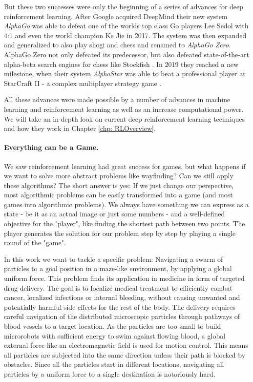  But these two successes were only the beginning of a series of advances for deep reinforcement learning. After Google acquired DeepMind their new system \textit{AlphaGo} was able to defeat one of the worlds top class Go players Lee Sedol with 4:1 \cite{borowiec2016alphago} and even the world champion Ke Jie in 2017. The system was then expanded and generalized to also play shogi and chess and renamed to \textit{AlphaGo Zero}. AlphaGo Zero not only defeated its predecessor, but also defeated state-of-the-art alpha-beta search engines for chess like Stockfish \cite{silver2017mastering}. In 2019 they reached a new milestone, when their system \textit{AlphaStar} was able to beat a professional player at StarCraft II - a complex multiplayer strategy game \cite{arulkumaran2019alphastar}. 

 All these advances were made possible by a number of advances in machine learning and reinforcement learning as well as an increase computational power. We will take an in-depth look on current deep reinforcement learning techniques and how they work in Chapter \ref{chp: RLOverview}.

 \paragraph{Everything can be a Game.}
 We saw reinforcement learning had great success for games, but what happens if we want to solve more abstract problems like wayfinding? Can we still apply these algorithms? The short answer is yes: If we just change our perspective, most algorithmic problems can be easily transformed into a game (and most games into algorithmic problems). We always have something we can express as a state - be it as an actual image or just some numbers - and a well-defined objective for the "player", like finding the shortest path between two points. The player generates the solution for our problem step by step by playing a single round of the "game".

 In this work we want to tackle a specific problem: Navigating a swarm of particles to a goal position in a maze-like environment, by applying a global uniform force. This problem finds its application in medicine in form of targeted drug delivery. The goal is to localize medical treatment to efficiently combat cancer, localized infections or internal bleeding, without causing unwanted and potentially harmful side effects for the rest of the body. The delivery requires careful navigation of the distributed microscopic particles through pathways of blood vessels to a target location. As the particles are too small to build microrobots with sufficient energy to swim against flowing blood, a global external force like an electromagnetic field is used for motion control. This means all particles are subjected into the same direction unless their path is blocked by obstacles. Since all the particles start in different locations, navigating all particles by a uniform force to a single destination is notoriously hard.

